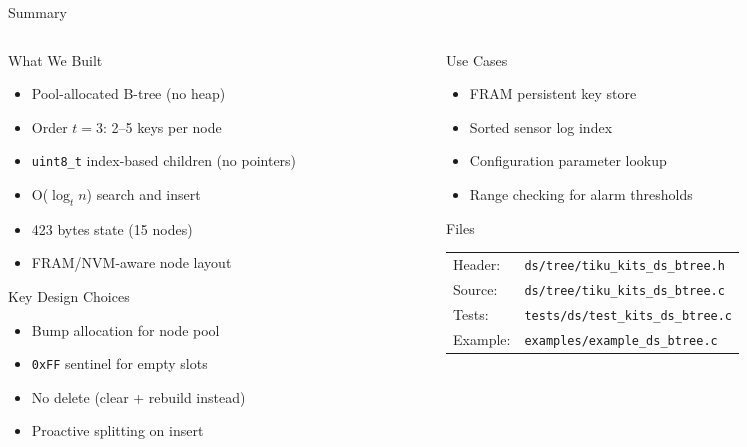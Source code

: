 \documentclass[aspectratio=169, 10pt]{beamer}
\begin{document}
\begin{frame}{Summary}
\begin{columns}[T]
\begin{column}{0.48\textwidth}
\begin{block}{What We Built}
\begin{itemize}
  \item Pool-allocated B-tree (no heap)
  \item Order $t = 3$: 2--5 keys per node
  \item \texttt{uint8\_t} index-based children (no pointers)
  \item O($\log_t n$) search and insert
  \item 423 bytes state (15 nodes)
  \item FRAM/NVM-aware node layout
\end{itemize}
\end{block}

\begin{block}{Key Design Choices}
\begin{itemize}
  \item Bump allocation for node pool
  \item \texttt{0xFF} sentinel for empty slots
  \item No delete (clear + rebuild instead)
  \item Proactive splitting on insert
\end{itemize}
\end{block}
\end{column}

\begin{column}{0.48\textwidth}
\begin{block}{Use Cases}
\begin{itemize}
  \item FRAM persistent key store
  \item Sorted sensor log index
  \item Configuration parameter lookup
  \item Range checking for alarm thresholds
\end{itemize}
\end{block}

\begin{block}{Files}
\scriptsize
\begin{tabular}{@{}lp{4.5cm}@{}}
Header: & \texttt{ds/tree/tiku\_kits\_ds\_btree.h} \\
Source: & \texttt{ds/tree/tiku\_kits\_ds\_btree.c} \\
Tests: & \texttt{tests/ds/test\_kits\_ds\_btree.c} \\
Example: & \texttt{examples/example\_ds\_btree.c} \\
\end{tabular}
\end{block}
\end{column}
\end{columns}
\end{frame}
\end{document}
